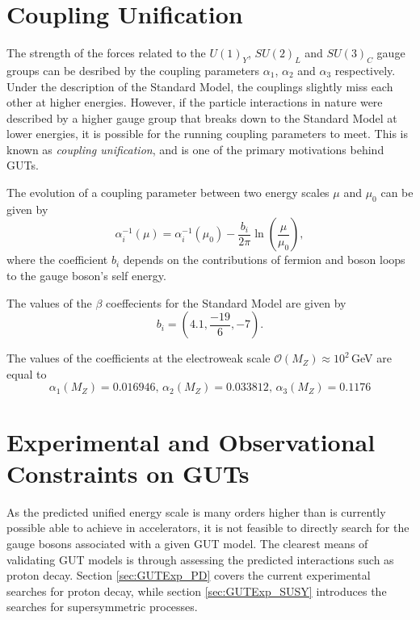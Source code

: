 \documentclass{article}
\begin{document}
\section{Coupling Unification}%
\label{sec:CouplingUnification}
The strength of the forces related to the $U(1)_Y$, $SU(2)_L$ and $SU(3)_C$ gauge groups can be desribed by the coupling parameters $\alpha_1$, $\alpha_2$ and $\alpha_3$ respectively. Under the description of the Standard Model, the couplings slightly miss each other at higher energies. However, if the particle interactions in nature were described by a higher gauge group that breaks down to the Standard Model at lower energies, it is possible for the running coupling parameters to meet. This is known as \textit{coupling unification}, and is one of the primary motivations behind GUTs.

The evolution of a coupling parameter between two energy scales $\mu$ and $\mu_0$ can be given by
\begin{equation}
\alpha^{-1}_{i}(\mu) = \alpha^{-1}_{i}(\mu_0) - \frac{b_i}{2\pi}\ln\left(\frac{\mu}{\mu_0}\right),
\end{equation}
where the coefficient $b_i$ depends on the contributions of fermion and boson loops to the gauge boson's self energy.

The values of the $\beta$ coeffecients for the Standard Model \cite{BetaFunction} are given by
\begin{equation}
b_i = \left( 4.1,\frac{-19}{6}, -7 \right).
\end{equation}

The values of the coefficients \cite{SO10_2} at the electroweak scale $\mathcal{O}(M_Z)\approx10^2\,$GeV are equal to 
\begin{equation}
\alpha_1(M_Z) = 0.016946,\,\alpha_2(M_Z)=0.033812,\,\alpha_3(M_Z) = 0.1176
\end{equation}


\section{Experimental and Observational Constraints on GUTs}%
\label{sec:GUTExp}
As the predicted unified energy scale is many orders higher than is currently possible able to achieve in accelerators, it is not feasible to directly search for the gauge bosons associated with a given GUT model. The clearest means of validating GUT models is through assessing the predicted interactions such as proton decay. Section \ref{sec:GUTExp_PD} covers the current experimental searches for proton decay, while section \ref{sec:GUTExp_SUSY} introduces the searches for supersymmetric processes.
\end{document}
